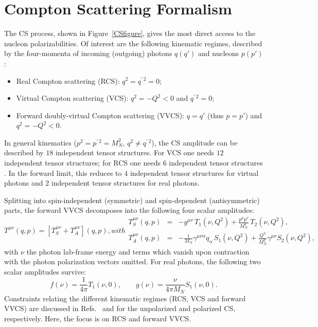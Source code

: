 \documentclass[preprints,review,accept,moreauthors,pdftex]{Definitions/mdpi}
\def\beq{\begin{equation}}
\def\eeq{\end{equation}}
\def\bea{\begin{eqnarray}}
\def\eea{\end{eqnarray}}
\def\eqlab#1{\label{eq:#1}}
\def\al{\alpha}
\begin{document}
\section{Compton Scattering Formalism} \label{CSintro}

The CS process, shown in Figure~\ref{CSfigure}, gives the most direct access to the nucleon polarizabilities. Of interest are the following kinematic regimes, described by the four-momenta of incoming (outgoing) photons $q(q')$ and nucleons $p(p')$:
\begin{itemize}[leftmargin=*,labelsep=5.8mm]
\item	Real Compton scattering (RCS): $q^2=q^{\prime\,2}=0$;
\item	Virtual Compton scattering (VCS): $q^2=-Q^2<0$ and $q^{\prime\,2}=0$;
\item	Forward doubly-virtual Compton scattering (VVCS): $q=q'$ (thus $p=p'$) and $q^2=-Q^2<0$.
\end{itemize}
In general kinematics ($p^2=p^{\prime\,2}=M_N^2$, $q^2 \neq q^{\prime\,2}$), the CS amplitude can be described by $18$ independent tensor structures. For VCS one needs $12$ independent tensor structures; for RCS one needs $6$ independent tensor structures \cite{Hearn:1962zz,Babusci:1998ww}. In the forward limit, this reduces to $4$ independent tensor structures for virtual photons and $2$ independent tensor structures for real photons. 







Splitting into spin-independent (symmetric) and spin-dependent (antisymmetric) parts, the forward VVCS decomposes into the following four scalar amplitudes:
\begin{subequations}
\beq
T^{\mu \nu} (q,p) = \left[T^{\mu \nu}_S+T^{\mu \nu}_A\right] (q,p) ,
\eeq
with
\bea
T^{\mu \nu}_S(q,p) & = & -g^{\mu\nu}\,
T_1(\nu, Q^2)  +\frac{p^{\mu} p^{\nu} }{M_N^2} \, T_2(\nu, Q^2), \eqlab{VVCS_TS}\\
T^{\mu \nu}_A (q,p) & = &-\frac{1}{M_N}\gamma^{\mu \nu \al} q_\al \,S_1(\nu, Q^2) +
\frac{Q^2}{M_N^2}  \gamma^{\mu\nu} S_2(\nu, Q^2),
\eea
\end{subequations}
with $\nu$ the photon lab-frame energy and terms which vanish upon contraction with the photon polarization vectors omitted. For real photons, the following two scalar amplitudes  survive: 
\beq
f(\nu)=\frac{1}{4\pi}T_1(\nu,0), \qquad g(\nu)=\frac{\nu }{4\pi M_N} S_1(\nu,0).
\eeq
Constraints relating the different kinematic regimes (RCS, VCS and forward VVCS) are discussed in Refs.~\cite{Lensky:2017bwi} and \cite{Pascalutsa:2014zna,Lensky:2017dlc} for the unpolarized and polarized CS, respectively. Here, the focus is on RCS and forward VVCS.
\end{document}
